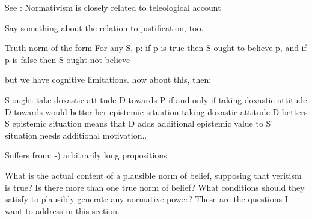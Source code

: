 \documentclass[12pt,numbers=noenddot]{scrartcl}
\begin{document}
See \textcite{engel_defence_2013}: Normativism is closely related to teleological account



Say something about the relation to justification, too.



Truth norm of the form
For any S, p: if p is true then S ought to believe p, and if p is false then S ought not believe \textcite[5]{Mchugh2012-MCHTTN}


but we have cognitive limitations. how about this, then:

S ought take doxastic attitude D towards P if and only if taking doxastic attitude D towards would better her epistemic situation
taking doxastic attitude D betters S epistemic situation means that D adds additional epistemic value to S' situation
needs additional motivation..



Suffers from: -) arbitrarily long propositions




What is the actual content of a plausible norm of belief, supposing that veritism is true? Is there more than one true norm of belief? What conditions should they satisfy to plausibly generate any normative power? These are the questions I want to address in this section.
\end{document}
